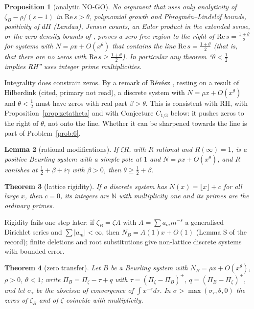 \documentclass[11pt]{amsart}
\newtheorem{theorem}{Theorem}[section]
\newtheorem{proposition}[theorem]{Proposition}
\newtheorem{lemma}[theorem]{Lemma}
\theoremstyle{definition}
\theoremstyle{remark}
\newcommand{\N}{\mathbb N}
\newcommand{\Rel}{\mathrm{Re}\,}
\begin{document}
\begin{proposition}[analytic NO-GO]\label{prop:analyticnogo}
No argument that uses only analyticity of $\zeta_B-\rho/(s-1)$ in $\Rel s>\theta$, polynomial growth and
Phragm\'en--Lindel\"of bounds, positivity of $d\Pi$ (Landau), Jensen counts, an Euler product in the extended sense,
or the zero-density bounds of \cite{Broucke2024}, proves a zero-free region to the right of $\Rel s=\frac{1+\theta}2$
for systems with $N=\rho x+O(x^\theta)$ that contains the line $\Rel s=\frac{1+\theta}2$ (that is, that there are no
zeros with $\Rel s\ge\frac{1+\theta}2$). In particular any theorem ``$\theta<\frac12$ implies RH'' uses integer prime
multiplicities.
\end{proposition}

\noindent Integrality does constrain zeros. By a remark of R\'ev\'esz \cite[Rem.~7]{Revesz2023}, resting on a result
of Hilberdink \cite{Hilberdink2010} (cited, primary not read), a discrete system with $N=\rho x+O(x^\theta)$ and
$\theta<\frac12$ must have zeros with real part $\beta>\theta$. This is consistent with RH, with
Proposition~\ref{prop:zetatheta} and with Conjecture $C_{1/3}$ below: it pushes zeros to the right of $\theta$, not onto
the line. Whether it can be sharpened towards the line is part of Problem~\ref{prob:6}.

\begin{lemma}[rational modifications]\label{lem:ratmod}
If $\zeta R$, with $R$ rational and $R(\infty)=1$, is a positive Beurling system with a simple pole at $1$ and
$N=\rho x+O(x^\theta)$, and $R$ vanishes at $\frac12+\beta+i\gamma$ with $\beta>0$, then $\theta\ge\frac12+\beta$.
\end{lemma}

\begin{theorem}[lattice rigidity]\label{thm:latticerig}
If a discrete system has $N(x)=\lfloor x\rfloor+c$ for all large $x$, then $c=0$, its integers are $\N$ with
multiplicity one and its primes are the ordinary primes.
\end{theorem}

\noindent Rigidity fails one step later: if $\zeta_B=\zeta A$ with $A=\sum a_mm^{-s}$ a generalised Dirichlet series and
$\sum|a_m|<\infty$, then $N_B=A(1)x+O(1)$ (Lemma S of the record); finite deletions and root substitutions give
non-lattice discrete systems with bounded error.

\begin{theorem}[zero transfer]\label{thm:zerotransfer}
Let $B$ be a Beurling system with $N_B=\rho x+O(x^\theta)$, $\rho>0$, $\theta<1$; write $\Pi_B=\Pi_\zeta-\tau+q$ with
$\tau=(\Pi_\zeta-\Pi_B)^+$, $q=(\Pi_B-\Pi_\zeta)^+$, and let $\sigma_\tau$ be the abscissa of convergence of
$\int x^{-s}d\tau$. In $\sigma>\max(\sigma_\tau,\theta,0)$ the zeros of $\zeta_B$ and of $\zeta$ coincide with multiplicity.
\end{theorem}
\end{document}
